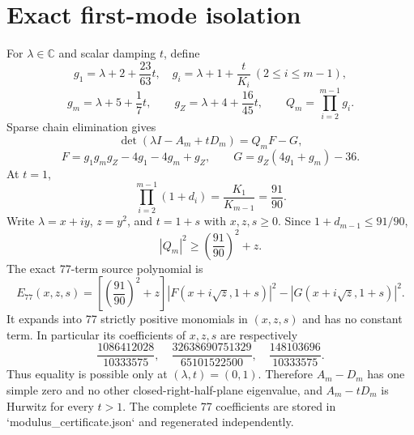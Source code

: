 \section*{Exact first-mode isolation}
For $\lambda\in\mathbb C$ and scalar damping $t$, define
\[
g_1=\lambda+2+\frac{23}{63}t,
\quad
g_i=\lambda+1+\frac{t}{K_i}\ (2\le i\le m-1),
\]
\[
g_m=\lambda+5+\frac17t,
\qquad
g_Z=\lambda+4+\frac{16}{45}t,
\qquad
Q_m=\prod_{i=2}^{m-1}g_i.
\]
Sparse chain elimination gives
\[
\det(\lambda I-A_m+tD_m)=Q_mF-G,
\]
\[
F=g_1g_mg_Z-4g_1-4g_m+g_Z,
\qquad
G=g_Z(4g_1+g_m)-36.
\]
At $t=1$,
\[
\prod_{i=2}^{m-1}(1+d_i)=\frac{K_1}{K_{m-1}}=\frac{91}{90}.
\]
Write $\lambda=x+iy$, $z=y^2$, and $t=1+s$ with $x,z,s\ge0$.  Since
$1+d_{m-1}\le91/90$,
\[
|Q_m|^2\ge\left(\frac{91}{90}\right)^2+z.
\]
The exact 77-term source polynomial is
\[
E_{77}(x,z,s)=
\left[\left(\frac{91}{90}\right)^2+z\right]
|F(x+i\sqrt z,1+s)|^2-|G(x+i\sqrt z,1+s)|^2.
\]
It expands into 77 strictly positive monomials in $(x,z,s)$ and has no constant
term.  In particular its coefficients of $x,z,s$ are respectively
\[
\frac{1086412028}{10333575},
\quad
\frac{32638690751329}{65101522500},
\quad
\frac{148103696}{10333575}.
\]
Thus equality is possible only at $(\lambda,t)=(0,1)$.  Therefore
$A_m-D_m$ has one simple zero and no other closed-right-half-plane eigenvalue,
and $A_m-tD_m$ is Hurwitz for every $t>1$.  The complete 77 coefficients are
stored in `modulus_certificate.json` and regenerated independently.
